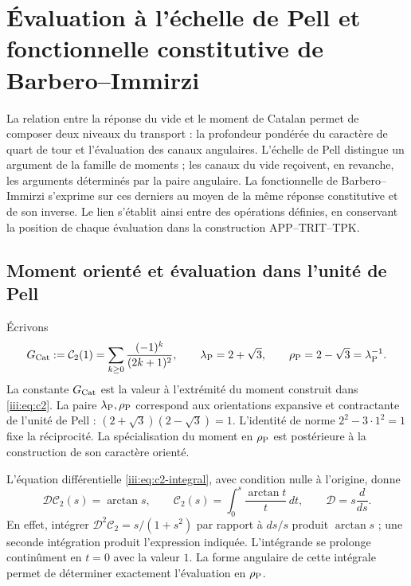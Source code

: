 \section{Évaluation à l’échelle de Pell et fonctionnelle constitutive de Barbero--Immirzi}
\label{iii:sec:pell-barbero}

La relation entre la réponse du vide et le moment de Catalan permet de
composer deux niveaux du transport : la profondeur pondérée du caractère
de quart de tour et l’évaluation des canaux angulaires. L’échelle de
Pell distingue un argument de la famille de moments ; les canaux du
vide reçoivent, en revanche, les arguments déterminés par la paire angulaire.
La fonctionnelle de Barbero--Immirzi s’exprime sur ces derniers au moyen de
la même réponse constitutive et de son inverse. Le lien s’établit ainsi
entre des opérations définies, en conservant la position de chaque évaluation
dans la construction APP--TRIT--TPK.

\subsection{Moment orienté et évaluation dans l’unité de Pell}

Écrivons
\begin{equation}
 G_{\rm Cat}:=\mathcal C_2(1)
 =\sum_{k\geq0}\frac{(-1)^k}{(2k+1)^2},\qquad
 \lambda_{\rm P}=2+\sqrt3,\qquad
 \rho_{\rm P}=2-\sqrt3=\lambda_{\rm P}^{-1}.
 \label{iii:eq:pell-scales}
\end{equation}
La constante $G_{\rm Cat}$ est la valeur à l’extrémité du moment construit dans
\eqref{iii:eq:c2}. La paire $\lambda_{\rm P},\rho_{\rm P}$ correspond aux
orientations expansive et contractante de l’unité de Pell :
$(2+\sqrt3)(2-\sqrt3)=1$. L’identité de norme $2^2-3\cdot1^2=1$
fixe la réciprocité. La spécialisation du moment en $\rho_{\rm P}$
est postérieure à la construction de son caractère orienté.

L’équation différentielle \eqref{iii:eq:c2-integral}, avec condition nulle
à l’origine, donne
\begin{equation}
 \mathcal D\mathcal C_2(s)=\arctan s,\qquad
 \mathcal C_2(s)=\int_0^s\frac{\arctan t}{t}\,dt,
 \qquad \mathcal D=s\frac{d}{ds}.
 \label{iii:eq:pell-moment-integral}
\end{equation}
En effet, intégrer $\mathcal D^2\mathcal C_2=s/(1+s^2)$ par rapport à
$ds/s$ produit $\arctan s$ ; une seconde intégration produit l’expression
indiquée. L’intégrande se prolonge continûment en $t=0$ avec la valeur $1$.
La forme angulaire de cette intégrale permet de déterminer exactement
l’évaluation en $\rho_{\rm P}$.

